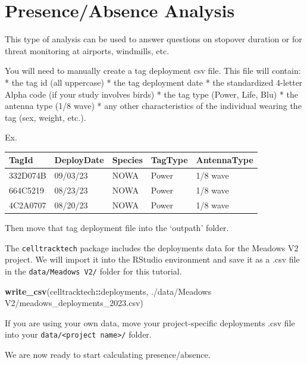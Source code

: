 \documentclass[
]{book}
\newenvironment{Shaded}{\begin{snugshade}}{\end{snugshade}}
\newcommand{\FunctionTok}[1]{\textcolor[rgb]{0.13,0.29,0.53}{\textbf{#1}}}
\newcommand{\NormalTok}[1]{#1}
\newcommand{\SpecialCharTok}[1]{\textcolor[rgb]{0.81,0.36,0.00}{\textbf{#1}}}
\newcommand{\StringTok}[1]{\textcolor[rgb]{0.31,0.60,0.02}{#1}}
\newcounter{none} %
\begin{document}
\chapter{Presence/Absence Analysis}\label{presenceabsence-analysis}

This type of analysis can be used to answer questions on stopover duration or for threat monitoring at airports, windmills, etc.

You will need to manually create a tag deployment csv file. This file will contain:
* the tag id (all uppercase)
* the tag deployment date
* the standardized 4-letter Alpha code (if your study involves birds)
* the tag type (Power, Life, Blu)
* the antenna type (1/8 wave)
* any other characteristics of the individual wearing the tag (sex, weight, etc.).

Ex.

{\def\LTcaptype{none} %
\begin{longtable}[]{@{}lllll@{}}
\toprule\noalign{}
TagId & DeployDate & Species & TagType & AntennaType \\
\midrule\noalign{}
\endhead
\bottomrule\noalign{}
\endlastfoot
332D074B & 09/03/23 & NOWA & Power & 1/8 wave \\
664C5219 & 08/23/23 & NOWA & Power & 1/8 wave \\
4C2A0707 & 08/20/23 & NOWA & Power & 1/8 wave \\
\end{longtable}
}

Then move that tag deployment file into the `outpath' folder.

The \texttt{celltracktech} package includes the deployments data for the Meadows V2 project. We will import it into the RStudio environment and save it as a .csv file in the \texttt{data/Meadows\ V2/} folder for this tutorial.

\begin{Shaded}
\begin{Highlighting}[]
\FunctionTok{write\_csv}\NormalTok{(celltracktech}\SpecialCharTok{::}\NormalTok{deployments, }\StringTok{\textquotesingle{}./data/Meadows V2/meadows\_deployments\_2023.csv\textquotesingle{}}\NormalTok{)}
\end{Highlighting}
\end{Shaded}

If you are using your own data, move your project-specific deployments .csv file into your \texttt{data/\textless{}project\ name\textgreater{}/} folder.

We are now ready to start calculating presence/absence.
\end{document}
